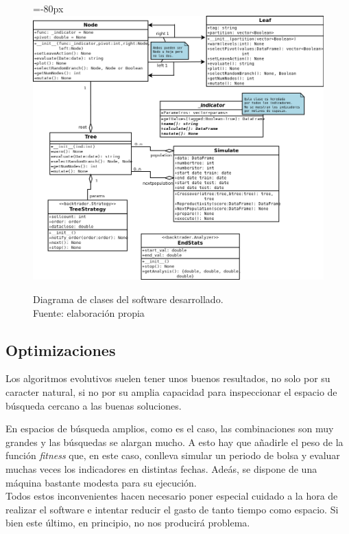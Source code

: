      	\begin{figure}[H]
    		\centering\leftskip=-80px
    		\includegraphics[scale=0.60]{imagenes/diagramaClases.png}
    	    \caption[Diagrama de clases del software desarrollado.]{Diagrama de clases del software desarrollado.\\ Fuente: elaboraci\'on propia}
    		\label{fig:diagclases}
	   \end{figure}

\subsection{Optimizaciones}

Los algoritmos evolutivos suelen tener unos buenos resultados, no solo por su caracter natural, si no por su amplia capacidad para inspeccionar el espacio de b\'usqueda cercano a las buenas soluciones.

En espacios de b\'usqueda amplios, como es el caso, las combinaciones son muy grandes y las b\'usquedas se alargan mucho. A esto hay que a\~nadirle el peso de la funci\'on \textit{fitness} que, en este caso, conlleva simular un periodo de bolsa y evaluar muchas veces los indicadores en distintas fechas. Ade\'as, se dispone de una m\'aquina bastante modesta para su ejecuci\'on.\\

Todos estos inconvenientes hacen necesario poner especial cuidado a la hora de realizar el software e intentar reducir el gasto de tanto tiempo como espacio. Si bien este \'ultimo, en principio, no nos producir\'a problema.

